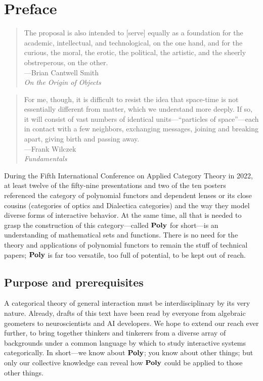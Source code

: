 \documentclass[Book-Poly]{subfiles}
\begin{document}
\chapter*{Preface}\label{chapter.0}

\begin{quote}
	The proposal is also intended to [serve] equally as a foundation for the academic, intellectual, and technological, on the one hand, and for the curious, the moral, the erotic, the political, the artistic, and the sheerly obstreperous, on the other.\\
\mbox{}\hfill ---Brian Cantwell Smith\\
\mbox{}\hfill \emph{On the Origin of Objects}
\end{quote}

\begin{quote}
For me, though, it is difficult to resist the idea that space-time is not essentially different from matter, which we understand more deeply. If so, it will consist of vast numbers of identical units---``particles of space''---each in contact with a few neighbors, exchanging messages, joining and breaking apart, giving birth and passing away.\\
\mbox{}\hfill ---Frank Wilczek\\
\mbox{}\hfill \emph{Fundamentals}
\end{quote}

During the Fifth International Conference on Applied Category Theory in 2022, at least twelve of the fifty-nine presentations and two of the ten posters referenced the category of polynomial functors and dependent lenses or its close cousins (categories of optics and Dialectica categories) and the way they model diverse forms of interactive behavior.
At the same time, all that is needed to grasp the construction of this category---called $\mathbf{Poly}$ for short---is an understanding of mathematical sets and functions.
There is no need for the theory and applications of polynomial functors to remain the stuff of technical papers; $\mathbf{Poly}$ is far too versatile, too full of potential, to be kept out of reach.

\section*{Purpose and prerequisites}

A categorical theory of general interaction must be interdisciplinary by its very nature.
Already, drafts of this text have been read by everyone from algebraic geometers to neuroscientists and AI developers.
We hope to extend our reach ever further, to bring together thinkers and tinkerers from a diverse array of backgrounds under a common language by which to study interactive systems categorically.
In short---we know about $\mathbf{Poly}$; you know about other things; but only our collective knowledge can reveal how $\mathbf{Poly}$ could be applied to those other things.
\end{document}
